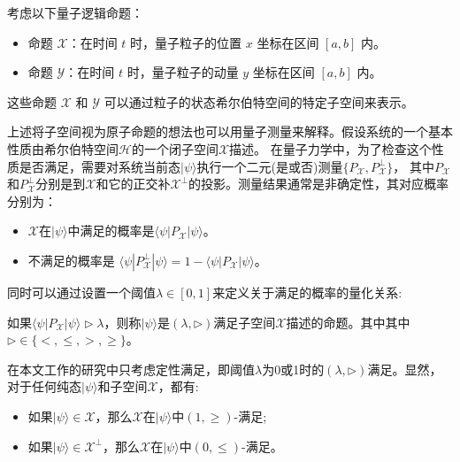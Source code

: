 \begin{example}\citep{2021}
    考虑以下量子逻辑命题：

\begin{itemize}
\item 命题 \( \mathcal{X} \)：在时间 \( t \) 时，量子粒子的位置 \( x \) 坐标在区间 \( [a, b] \) 内。
\item 命题 \( \mathcal{Y} \)：在时间 \( t \) 时，量子粒子的动量 \( y \) 坐标在区间 \( [a, b] \) 内。
\end{itemize}
这些命题 \( \mathcal{X} \) 和 \( \mathcal{Y} \) 可以通过粒子的状态希尔伯特空间的特定子空间来表示。
\end{example}


上述将子空间视为原子命题的想法也可以用量子测量来解释。假设系统的一个基本性质由希尔伯特空间$\mathcal{H}$的一个闭子空间$\mathcal{X}$描述。
在量子力学中，为了检查这个性质是否满足，需要对系统当前态$|\psi\rangle$执行一个二元(是或否)测量$\{P_{\mathcal{X}}, P_{\mathcal{X}}^{\perp}\}$，
其中$P_{\mathcal{X}}$和$P_{\mathcal{X}}^\perp$分别是到$\mathcal{X}$和它的正交补$\mathcal{X}^\perp$的投影。测量结果通常是非确定性，其对应概率分别为：
\begin{itemize}
    \item $\mathcal{X}$在$|\psi\rangle$中满足的概率是$\langle\psi|P_{\mathcal{X}}|\psi\rangle$。
    \item 不满足的概率是
    $\langle\psi|P_{\mathcal{X}}^\perp|\psi\rangle = 1 - \langle\psi|P_{\mathcal{X}}|\psi\rangle$。
\end{itemize}
同时可以通过设置一个阈值$\lambda \in [0,1]$来定义关于满足的概率的量化关系:

\begin{definition}\citep{2021}
    如果$\langle\psi|P_{\mathcal{X}}|\psi\rangle \rhd \lambda$，则称$|\psi\rangle$是$(\lambda, \rhd)$满足子空间$\mathcal{X}$描述的命题。其中其中$\rhd \in \{<, \leq, >, \geq\}$。 
\end{definition}

在本文工作的研究中只考虑定性满足，即阈值$\lambda$为0或1时的$(\lambda, \rhd)$满足。显然，对于任何纯态$|\psi\rangle$和子空间$\mathcal{X}$，都有:

\begin{itemize}
\item 如果$|\psi\rangle \in \mathcal{X}$，那么$\mathcal{X}$在$|\psi\rangle$中$(1, \geq)$-满足;
\item 如果$|\psi\rangle \in \mathcal{X}^\perp$，那么$\mathcal{X}$在$|\psi\rangle$中$(0, \leq)$-满足。
\end{itemize}

